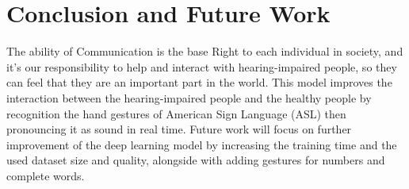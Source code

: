 \documentclass[12pt]{report}
\begin{document}
\chapter{Conclusion and Future Work}
The ability of Communication is the base Right to each individual in society,
and it's our responsibility to help and interact with hearing-impaired people,
so they can feel that they are an important part in the world.
This model improves the interaction between the hearing-impaired people 
and the healthy people by recognition the hand gestures of American Sign Language (ASL)
then pronouncing it as sound in real time. Future work will focus on 
further improvement of the deep learning model by increasing the training time 
and the used dataset size and quality, alongside with adding gestures for numbers 
and complete words.
\renewcommand\bibname{References}            


\end{document}
